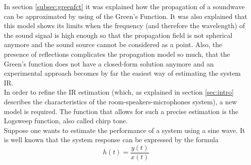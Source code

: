 In section \ref{subsec:greenfct} it was explained how the propagation of a soundwave can be approximated by using of the Green's Function. It was also explained that this model shows its limits when the frequency (and therefore the wavelength) of the sound signal is high enough so that the propagation field is not spherical anymore and the sound source cannot be considered as a point. Also, the presence of reflections complicates the propagation model so much, that the Green's function does not have a closed-form solution anymore and an experimental approach becomes by far the easiest way of estimating the system IR.
\\ 
In order to refine the IR estimation (which, as explained in section \ref{sec:intro} describes the characteristics of the room-speakers-microphones system), a new model is required. The function that allows for such a precise estimation is the Logsweep function, also called chirp tone.
\\
Suppose one wants to estimate the performance of a system using a sine wave. It is well known that the system response can be expressed by the formula
\begin{equation}
h(t) = \frac{y(t)}{x(t)}
\label{eqn:h}
\end{equation}

